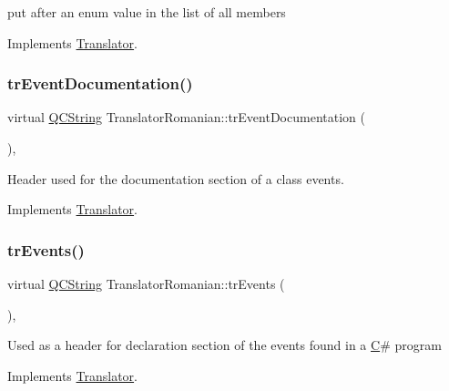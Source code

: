 put after an enum value in the list of all members 

Implements \mbox{\hyperlink{class_translator}{Translator}}.

\mbox{\label{class_translator_romanian_ae21160d8e96af54ba2a52cecf67db73b}} 
\subsubsection{\texorpdfstring{trEventDocumentation()}{trEventDocumentation()}}
{\footnotesize\ttfamily virtual \mbox{\hyperlink{class_q_c_string}{Q\+C\+String}} Translator\+Romanian\+::tr\+Event\+Documentation (\begin{DoxyParamCaption}{ }\end{DoxyParamCaption})\hspace{0.3cm}{\ttfamily [inline]}, {\ttfamily [virtual]}}

Header used for the documentation section of a class\textquotesingle{} events. 

Implements \mbox{\hyperlink{class_translator}{Translator}}.

\mbox{\label{class_translator_romanian_a4ebd39202b30ee56ceff1437f102dbd1}} 
\subsubsection{\texorpdfstring{trEvents()}{trEvents()}}
{\footnotesize\ttfamily virtual \mbox{\hyperlink{class_q_c_string}{Q\+C\+String}} Translator\+Romanian\+::tr\+Events (\begin{DoxyParamCaption}{ }\end{DoxyParamCaption})\hspace{0.3cm}{\ttfamily [inline]}, {\ttfamily [virtual]}}

Used as a header for declaration section of the events found in a \mbox{\hyperlink{class_c}{C}}\# program 

Implements \mbox{\hyperlink{class_translator}{Translator}}.

\mbox{\label{class_translator_romanian_a58425d4497f4cfde71a0ceb57c1d6a50}} 
